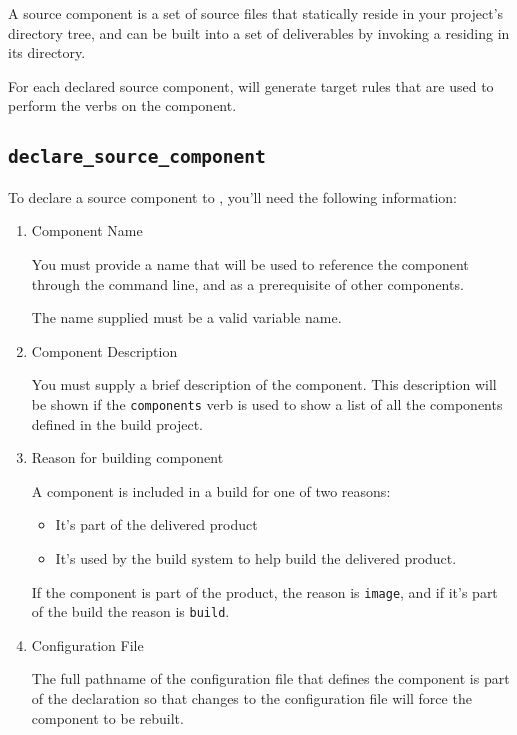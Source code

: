 A source component is a set of source files that statically reside in
your project's directory tree, and can be built into a set of
deliverables by invoking a \makefile residing in its directory.

For each declared source component, \lmsbw will generate target
\makefile rules that are used to perform the \lmsbw verbs on the component.

\subsection{\texttt{declare\_source\_component}}

To declare a source component to \lmsbw, you'll need the following
information:

\begin{enumerate}
\item Component Name

  You must provide a name that will be used to reference the component
  through the \lmsbw command line, and as a prerequisite of other
  components.

  The name supplied must be a valid \makefile variable name.

\item Component Description

  You must supply a brief description of the component.  This
  description will be shown if the \texttt{components} verb is used to
  show a list of all the components defined in the build project.

\item Reason for building component

  A component is included in a build for one of two reasons:

  \begin{itemize}
    \item It's part of the delivered product
    \item It's used by the build system to help build the delivered
      product.
  \end{itemize}

  If the component is part of the product, the reason is
  \texttt{image}, and if it's part of the build the reason is
  \texttt{build}.

\item Configuration File

  The full pathname of the configuration file that defines the
  component is part of the declaration so that changes to the
  configuration file will force the component to be rebuilt.


\end{enumerate}
